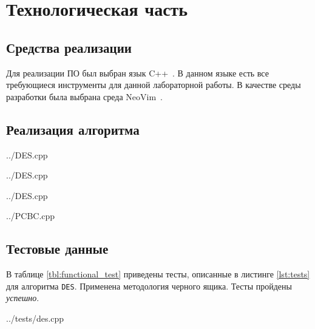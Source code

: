 \clearpage

\section{Технологическая часть}

\subsection{Средства реализации}

Для реализации ПО был выбран язык C++~\cite{c++}.
В данном языке есть все требующиеся инструменты для данной лабораторной работы.
В качестве среды разработки была выбрана среда NeoVim~\cite{nvim}.

\subsection{Реализация алгоритма}

\begin{lstinputlisting}[
        caption={\raggedright Реализация алгоритма DES.},
        label={lst:des},
        language={C++},
        linerange={3-32}
    ]{../DES.cpp}
\end{lstinputlisting}

\begin{lstinputlisting}[
        caption={\raggedright Реализация алгоритма DES, часть 2.},
        label={lst:des},
        language={C++},
        linerange={33-66,68-70}
    ]{../DES.cpp}
\end{lstinputlisting}

\begin{lstinputlisting}[
        caption={\raggedright Реализация алгоритма DES, часть 3.},
        label={lst:des-2},
        language={C++},
        linerange={71-81}
    ]{../DES.cpp}
\end{lstinputlisting}

\begin{lstinputlisting}[
        caption={\raggedright Реализация алгоритма шифрования PCBC.},
        label={lst:pcbc},
        language={C++},
        linerange={25-37,39-50}
    ]{../PCBC.cpp}
\end{lstinputlisting}

\subsection{Тестовые данные}

В таблице \ref{tbl:functional_test} приведены тесты, описанные в листинге \ref{lst:tests} для алгоритма \texttt{DES}. 
Применена методология черного ящика. Тесты пройдены \textit{успешно}.
%
\begin{lstinputlisting}[
        caption={\raggedright Реализация функциональных тестов.},
        label={lst:tests},
        language={C++},
        linerange={3-16}
    ]{../tests/des.cpp}
\end{lstinputlisting}

